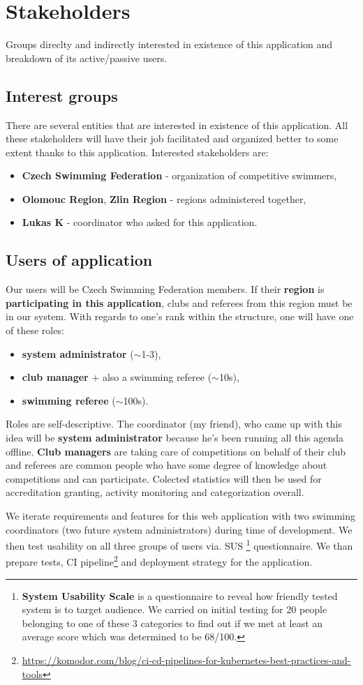 \section{Stakeholders}
Groups direclty and indirectly interested in existence of this application and breakdown of its active/passive users.
\subsection*{Interest groups}
There are several entities that are interested in existence of this application. All these stakeholders will have their job facilitated and organized better to some extent thanks to this application.  
Interested stakeholders are:
\begin{itemize}
  \item \textbf{Czech Swimming Federation} - organization of competitive swimmers,
  \item \textbf{Olomouc Region}, \textbf{Zlin Region} - regions administered together,
  \item \textbf{Lukas K} - coordinator who asked for this application.
\end{itemize}
\subsection*{Users of application}
Our users will be Czech Swimming Federation members. If their \textbf{region} is \textbf{participating in this application}, clubs and referees from this region must be in our system. With regards to one's rank within the structure, one will have one of these roles: 
\begin{itemize}
  \item \textbf{system administrator} ($\sim$1-3),
  \item \textbf{club manager} + also a swimming referee ($\sim$10s),
  \item \textbf{swimming referee} ($\sim$100s).
\end{itemize} 
Roles are self-descriptive. The coordinator (my friend), who came up with this idea will be \textbf{system administrator} because he's been running all this agenda offline. \textbf{Club managers} are taking care of competitions on behalf of their club and referees are common people who have some degree of knowledge about competitions and can participate. Colected statistics will then be used for accreditation granting, activity monitoring and categorization overall.
\par
We iterate requirements and features for this web application with two swimming coordinators (two future system administrators) during time of development. We then test usability on all three groups of users via. SUS \footnote{\textbf{System Usability Scale} is a questionnaire to reveal how friendly tested system is to target audience. We carried on initial testing for 20 people belonging to one of these 3 categories to find out if we met at least an average score which was determined to be 68/100.} questionnaire. We than prepare tests, CI pipeline\footnote{\url{https://komodor.com/blog/ci-cd-pipelines-for-kubernetes-best-practices-and-tools}} and deployment strategy for the application.
